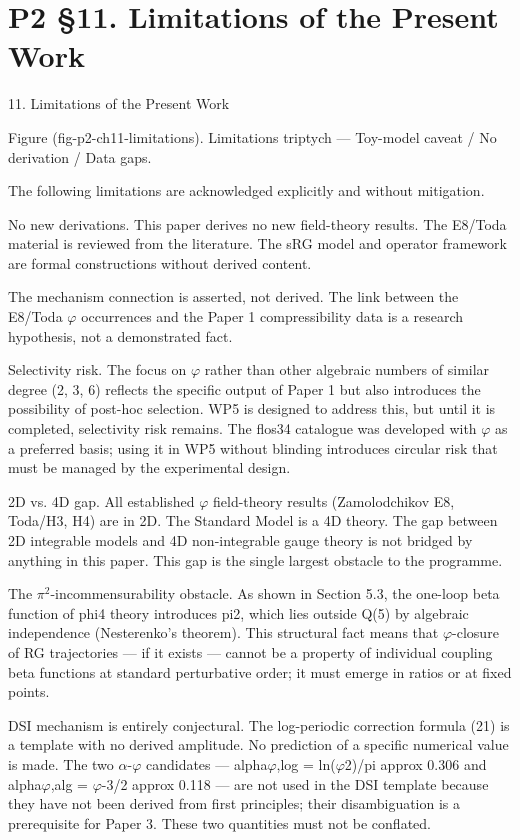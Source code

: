 
\section{P2 §11. Limitations of the Present Work}

11. Limitations of the Present Work

    Figure (fig-p2-ch11-limitations). Limitations triptych --- Toy-model caveat / No derivation / Data
                                                   gaps.

  The following limitations are acknowledged explicitly and without mitigation.

  No new derivations. This paper derives no new field-theory results. The E8/Toda
  material is reviewed from the literature. The sRG model and operator framework are
  formal constructions without derived content.

  The mechanism connection is asserted, not derived. The link between the E8/Toda $\varphi$
  occurrences and the Paper 1 compressibility data is a research hypothesis, not a
  demonstrated fact.

  Selectivity risk. The focus on $\varphi$ rather than other algebraic numbers of similar degree
  (2, 3, 6) reflects the specific output of Paper 1 but also introduces the possibility of
  post-hoc selection. WP5 is designed to address this, but until it is completed, selectivity
  risk remains. The flos34 catalogue was developed with $\varphi$ as a preferred basis; using it
  in WP5 without blinding introduces circular risk that must be managed by the
  experimental design.

  2D vs. 4D gap. All established $\varphi$ field-theory results (Zamolodchikov E8, Toda/H3, H4)
  are in 2D. The Standard Model is a 4D theory. The gap between 2D integrable models
  and 4D non-integrable gauge theory is not bridged by anything in this paper. This gap is
  the single largest obstacle to the programme.

  The $\pi^{2}$-incommensurability obstacle. As shown in Section 5.3, the one-loop beta
  function of phi4 theory introduces pi2, which lies outside Q(5) by algebraic
  independence (Nesterenko's theorem). This structural fact means that $\varphi$-closure of RG
  trajectories --- if it exists --- cannot be a property of individual coupling beta functions at
  standard perturbative order; it must emerge in ratios or at fixed points.

  DSI mechanism is entirely conjectural. The log-periodic correction formula (21) is a
  template with no derived amplitude. No prediction of a specific numerical value is
  made. The two $\alpha$-$\varphi$ candidates --- alpha$\varphi$,log = ln($\varphi$2)/pi approx 0.306 and alpha$\varphi$,alg =
  $\varphi$-3/2 approx 0.118 --- are not used in the DSI template because they have not been
  derived from first principles; their disambiguation is a prerequisite for Paper 3. These
  two quantities must not be conflated.

